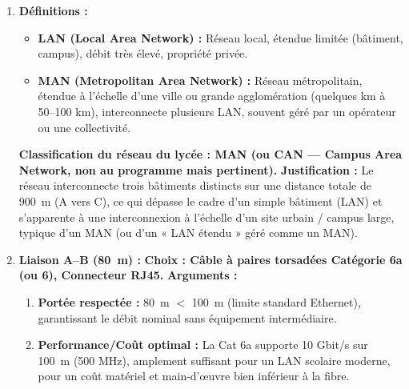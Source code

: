\documentclass[11pt]{article}
\newcommand{\cle}[1]{{\popxbold\color{popdark}#1}}
\begin{document}
\begin{corrige}
\begin{enumerate}
  \item \textbf{Définitions :}
  \begin{itemize}
    \item \textbf{\cle{LAN} (Local Area Network) :} Réseau local, étendue limitée (bâtiment, campus), débit très élevé, propriété privée.
    \item \textbf{\cle{MAN} (Metropolitan Area Network) :} Réseau métropolitain, étendue à l'échelle d'une ville ou grande agglomération (quelques km à 50--100 km), interconnecte plusieurs LAN, souvent géré par un opérateur ou une collectivité.
  \end{itemize}
  \textbf{Classification du réseau du lycée : \cle{MAN} (ou CAN — Campus Area Network, non au programme mais pertinent).}
  \textbf{Justification :} Le réseau interconnecte trois bâtiments distincts sur une distance totale de \SI{900}{m} (A vers C), ce qui dépasse le cadre d'un simple bâtiment (LAN) et s'apparente à une interconnexion à l'échelle d'un site urbain / campus large, typique d'un MAN (ou d'un « LAN étendu » géré comme un MAN).
  
  \item \textbf{Liaison A–B (\SI{80}{m}) :}
  \textbf{Choix : Câble à paires torsadées Catégorie 6a (ou 6), Connecteur RJ45.}
  \textbf{Arguments :}
  \begin{enumerate}
    \item \textbf{Portée respectée :} \SI{80}{m} $<$ \SI{100}{m} (limite standard Ethernet), garantissant le débit nominal sans équipement intermédiaire.
    \item \textbf{Performance/Coût optimal :} La Cat 6a supporte 10 Gbit/s sur \SI{100}{m} (500 MHz), amplement suffisant pour un LAN scolaire moderne, pour un coût matériel et main-d'œuvre bien inférieur à la fibre.
  \end{enumerate}
  

\end{enumerate}
\end{corrige}
\end{document}
